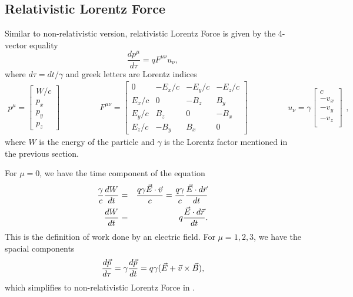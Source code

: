 \documentclass{article}
\begin{document}
\subsection{Relativistic Lorentz Force}
Similar to non-relativistic version, relativistic Lorentz Force is given by the 4-vector equality
\begin{equation}
    \frac{d p^{\mu}}{d \tau} = q F^{\mu \nu} u_{\nu} ,
\end{equation}
where $ d \tau = d t / \gamma $ and greek letters are Lorentz indices
\begin{equation*}
    \begin{aligned}
        p^{\mu} = 
        \begin{bmatrix}
            W/c \\
            p_x \\
            p_y \\
            p_z
        \end{bmatrix}    
    \end{aligned}
    \qquad\qquad
    \begin{aligned}
        F^{\mu\nu} = 
        \begin{bmatrix}
                0       & -E_x/c   & -E_y/c    & -E_z/c \\
                E_x/c   &   0      & -B_z      & B_y    \\
                E_y/c   &   B_z    &  0        & -B_x   \\
                E_z/c   &   -B_y   & B_x       & 0   
        \end{bmatrix} 
    \end{aligned}
    \qquad\qquad
    \begin{aligned}
        u_{\nu} = \gamma
        \begin{bmatrix}
                 c \\
                -v_x \\
                -v_y \\
                -v_z \\
        \end{bmatrix} 
    \end{aligned} ,
\end{equation*}
where $W$ is the energy of the particle and $\gamma$ is the Lorentz factor mentioned in the previous section.

For $ \mu = 0 $, we have the time component of the equation
\begin{eqnarray}
    \frac{\gamma}{c}\frac{d W}{d t} &=& \frac{q \gamma \vec{E}\cdot \vec{v}}{c} = \frac{q \gamma}{c}  \frac{\vec{E}  \cdot d \vec{r}}{d t} \\
    \frac{d W}{d t} &=& q \frac{\vec{E}\cdot d \vec{r}} {d t} .
\end{eqnarray}
This is the definition of work done by an electric field. For $ \mu = 1,2,3 $, we have the spacial components
\begin{equation*}
    \frac{d \vec{p}}{d \tau} = \gamma \frac{d \vec{p}}{d t} = q \gamma (\vec{E} + \vec{v} \times \vec{B}) ,
\end{equation*}
which simplifies to non-relativistic Lorentz Force in .
\end{document}
